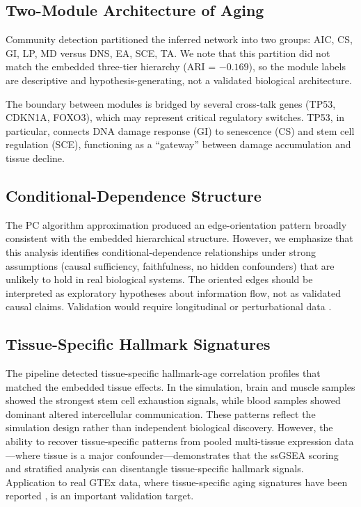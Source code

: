 \documentclass[11pt,a4paper]{article}
\begin{document}
\subsection{Two-Module Architecture of Aging}

Community detection partitioned the inferred network into two groups: AIC, CS, GI, LP, MD versus DNS, EA, SCE, TA. We note that this partition did not match the embedded three-tier hierarchy (ARI = $-0.169$), so the module labels are descriptive and hypothesis-generating, not a validated biological architecture.

The boundary between modules is bridged by several cross-talk genes (TP53, CDKN1A, FOXO3), which may represent critical regulatory switches. TP53, in particular, connects DNA damage response (GI) to senescence (CS) and stem cell regulation (SCE), functioning as a ``gateway'' between damage accumulation and tissue decline.

\subsection{Conditional-Dependence Structure}

The PC algorithm approximation produced an edge-orientation pattern broadly consistent with the embedded hierarchical structure. However, we emphasize that this analysis identifies conditional-dependence relationships under strong assumptions (causal sufficiency, faithfulness, no hidden confounders) that are unlikely to hold in real biological systems. The oriented edges should be interpreted as exploratory hypotheses about information flow, not as validated causal claims. Validation would require longitudinal or perturbational data \citep{kirkland2017cellular}.

\subsection{Tissue-Specific Hallmark Signatures}

The pipeline detected tissue-specific hallmark-age correlation profiles that matched the embedded tissue effects. In the simulation, brain and muscle samples showed the strongest stem cell exhaustion signals, while blood samples showed dominant altered intercellular communication. These patterns reflect the simulation design rather than independent biological discovery. However, the ability to recover tissue-specific patterns from pooled multi-tissue expression data---where tissue is a major confounder---demonstrates that the ssGSEA scoring and stratified analysis can disentangle tissue-specific hallmark signals. Application to real GTEx data, where tissue-specific aging signatures have been reported \citep{villeda2011aging, franceschi2018inflammaging}, is an important validation target.
\end{document}
